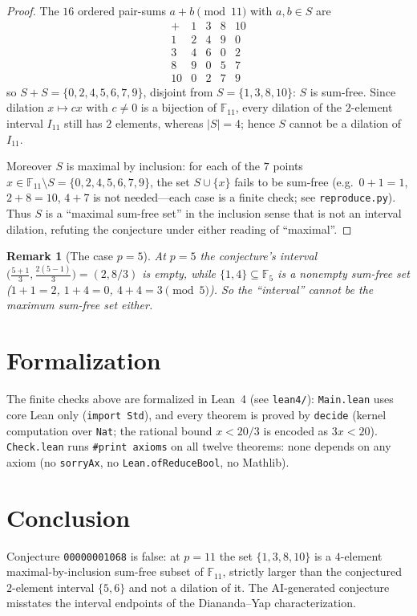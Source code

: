 \documentclass[11pt]{article}
\newtheorem{remark}{Remark}
\begin{document}
\begin{proof}
The $16$ ordered pair-sums $a + b \pmod{11}$ with $a, b \in S$ are
\[
\begin{array}{c|cccc}
+      & 1 & 3 & 8 & 10 \\ \hline
1      & 2 & 4 & 9 & 0  \\
3      & 4 & 6 & 0 & 2  \\
8      & 9 & 0 & 5 & 7  \\
10     & 0 & 2 & 7 & 9
\end{array}
\]
so $S + S = \{0, 2, 4, 5, 6, 7, 9\}$, disjoint from $S = \{1, 3, 8, 10\}$:
$S$ is sum-free. Since dilation $x \mapsto c x$ with $c \ne 0$ is a bijection
of $\mathbb{F}_{11}$, every dilation of the $2$-element interval $I_{11}$ still
has $2$ elements, whereas $|S| = 4$; hence $S$ cannot be a dilation of $I_{11}$.

Moreover $S$ is maximal by inclusion: for each of the $7$ points
$x \in \mathbb{F}_{11} \setminus S = \{0, 2, 4, 5, 6, 7, 9\}$, the set
$S \cup \{x\}$ fails to be sum-free (e.g.\ $0 + 1 = 1$, $2 + 8 = 10$,
$4 + 7$ is not needed---each case is a finite check; see
\texttt{reproduce.py}). Thus $S$ is a ``maximal sum-free set'' in the
inclusion sense that is not an interval dilation, refuting the conjecture
under either reading of ``maximal''.
\end{proof}

\begin{remark}[The case $p = 5$]
At $p = 5$ the conjecture's interval $\bigl(\frac{5+1}{3}, \frac{2(5-1)}{3}\bigr)
= (2, 8/3)$ is \emph{empty}, while $\{1, 4\} \subseteq \mathbb{F}_5$ is a
nonempty sum-free set ($1+1=2$, $1+4=0$, $4+4=3 \pmod 5$). So the ``interval''
cannot be the maximum sum-free set either.
\end{remark}

\section{Formalization}

The finite checks above are formalized in Lean~4 (see \texttt{lean4/}):
\texttt{Main.lean} uses core Lean only (\texttt{import Std}), and every theorem
is proved by \texttt{decide} (kernel computation over \texttt{Nat}; the
rational bound $x < 20/3$ is encoded as $3x < 20$). \texttt{Check.lean} runs
\texttt{\#print axioms} on all twelve theorems: none depends on any axiom
(no \texttt{sorryAx}, no \texttt{Lean.ofReduceBool}, no Mathlib).

\section{Conclusion}

Conjecture \texttt{00000001068} is false: at $p = 11$ the set
$\{1, 3, 8, 10\}$ is a $4$-element maximal-by-inclusion sum-free subset of
$\mathbb{F}_{11}$, strictly larger than the conjectured $2$-element interval
$\{5, 6\}$ and not a dilation of it. The AI-generated conjecture misstates
the interval endpoints of the Diananda--Yap characterization.
\end{document}

